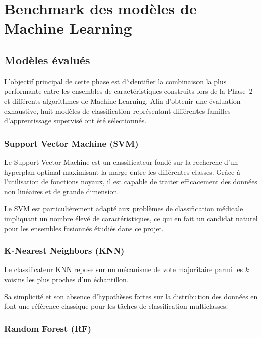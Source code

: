 \chapter{Benchmark des modèles de Machine Learning}

\section{Modèles évalués}

L'objectif principal de cette phase est d'identifier la combinaison la plus performante entre
les ensembles de caractéristiques construits lors de la Phase~2 et différents algorithmes de
Machine Learning. Afin d'obtenir une évaluation exhaustive, huit modèles de classification
représentant différentes familles d'apprentissage supervisé ont été sélectionnés.

\subsection{Support Vector Machine (SVM)}

Le Support Vector Machine est un classificateur fondé sur la recherche d'un hyperplan optimal
maximisant la marge entre les différentes classes. Grâce à l'utilisation de fonctions noyaux,
il est capable de traiter efficacement des données non linéaires et de grande dimension.

Le SVM est particulièrement adapté aux problèmes de classification médicale impliquant un
nombre élevé de caractéristiques, ce qui en fait un candidat naturel pour les ensembles
fusionnés étudiés dans ce projet.

\subsection{K-Nearest Neighbors (KNN)}

Le classificateur KNN repose sur un mécanisme de vote majoritaire parmi les $k$ voisins les plus
proches d'un échantillon.

Sa simplicité et son absence d'hypothèses fortes sur la distribution des données en font une
référence classique pour les tâches de classification multiclasses.

\subsection{Random Forest (RF)}

